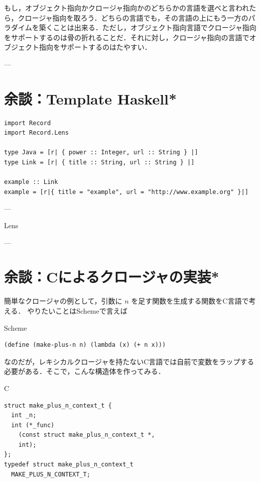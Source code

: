 \documentclass[a4paper,twocolumn]{jsbook}
\newcommand{\programminglanguage}[1]{\textsf{#1}}
\newcommand{\clang}{\programminglanguage{C}}
\newcommand{\haskell}{\programminglanguage{Haskell}}
\newcommand{\scheme}{\programminglanguage{Scheme}}
\newenvironment{ccode}{\begin{itembox}[r]{\clang}}{\end{itembox}}
\newenvironment{schemecode}{\begin{itembox}[r]{\scheme}}{\end{itembox}}
\begin{document}
もし，オブジェクト指向かクロージャ指向かのどちらかの言語を選べと言われたら，クロージャ指向を取ろう．どちらの言語でも，その言語の上にもう一方のパラダイムを築くことは出来る．ただし，オブジェクト指向言語でクロージャ指向をサポートするのは骨の折れることだ．それに対し，クロージャ指向の言語でオブジェクト指向をサポートするのはたやすい．

---

\section{余談：Template \haskell*}

\begin{verbatim}
import Record
import Record.Lens

type Java = [r| { power :: Integer, url :: String } |]
type Link = [r| { title :: String, url :: String } |]

example :: Link
example = [r|{ title = "example", url = "http://www.example.org" }|]
\end{verbatim}

---

Lens

---

\section*{余談：\clang によるクロージャの実装*}

簡単なクロージャの例として，引数に $n$ を足す関数を生成する関数を\clang 言語で考える．
やりたいことは\scheme で言えば
\begin{schemecode}
\begin{verbatim}
(define (make-plus-n n) (lambda (x) (+ n x)))
\end{verbatim}
\end{schemecode}
なのだが，レキシカルクロージャを持たない\clang 言語では自前で変数をラップする必要がある．そこで，こんな構造体を作ってみる．
\begin{ccode}
\begin{verbatim}
struct make_plus_n_context_t {
  int _n;
  int (*_func)
    (const struct make_plus_n_context_t *,
    int);
};
typedef struct make_plus_n_context_t
  MAKE_PLUS_N_CONTEXT_T;
\end{verbatim}
\end{ccode}
\end{document}
